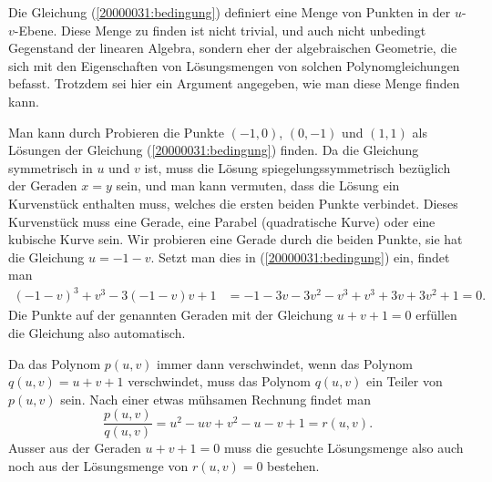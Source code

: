 \begin{diskussion}
Die Gleichung (\ref{20000031:bedingung}) definiert eine Menge von Punkten
in der $u$-$v$-Ebene.
Diese Menge zu finden ist nicht trivial, und auch nicht unbedingt Gegenstand
der linearen Algebra, sondern eher der algebraischen Geometrie, die sich
mit den Eigenschaften von Lösungsmengen von solchen Polynomgleichungen befasst.
Trotzdem sei hier ein Argument angegeben, wie man diese Menge finden kann.

Man kann durch Probieren die Punkte $(-1,0)$, $(0,-1)$ und $(1,1)$ als Lösungen
der Gleichung (\ref{20000031:bedingung}) finden.
Da die Gleichung symmetrisch in $u$ und $v$ ist, muss die Lösung
spiegelungssymmetrisch bezüglich der Geraden $x=y$ sein, und man kann
vermuten, dass die Lösung ein Kurvenstück enthalten muss, welches
die ersten beiden Punkte verbindet.
Dieses Kurvenstück muss eine Gerade, eine Parabel (quadratische Kurve) oder
eine kubische Kurve sein. 
Wir probieren eine Gerade durch die beiden Punkte, sie hat die Gleichung $u=-1-v$.
Setzt man dies in (\ref{20000031:bedingung}) ein, findet man
\begin{align*}
(-1-v)^3+v^3-3(-1-v)v+1
&=
-1-3v-3v^2-v^3+v^3+3v+3v^2+1=0.
\end{align*}
Die Punkte auf der genannten Geraden mit der Gleichung
$u+v+1=0$
erfüllen die Gleichung also automatisch.

Da das Polynom $p(u,v)$ immer dann verschwindet, wenn das Polynom $q(u,v)=u+v+1$
verschwindet, muss das Polynom $q(u,v)$ ein Teiler von $p(u,v)$ sein.
Nach einer etwas mühsamen Rechnung findet man 
\[
\frac{p(u,v)}{q(u,v)}= u^2 - uv + v^2-u-v+1=r(u,v).
\]
Ausser aus der Geraden $u+v+1=0$ muss die gesuchte Lösungsmenge also auch noch aus
der Lösungsmenge von $r(u,v)=0$ bestehen.


\end{diskussion}

